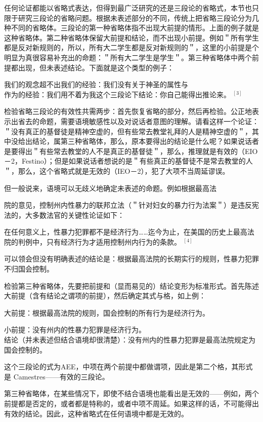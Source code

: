 任何论证都能以省略式表达，但得到最广泛研究的还是三段论的省略式，本节也只限于研究三段论的省略问题。根据未表述部分的不同，传统上把省略三段论分为几种不同的省略体。三段论的第一种省略体指不出现大前提的情形。上面的例子就是这种省略体。第二种省略体保留大前提和结论，而不出现小前提。例如＂所有学生都是反对新规则的，所以，所有大二学生都是反对新规则的＂，这里的小前提是个明显为真很容易补充出的命题：＂所有大二学生是学生＂。第三种省略体中两个前提都出现，但未表述结论。下面就是这个类型的例子：

我们的观念超不出我们的经验：我们没有关于神圣的属性与\\
作为的经验：我们用不着为我这个三段论下结论：你自己能得出推论来。 ${ }^{[3]}$

检验省略三段论的有效性共需两步：首先恢复省略的部分，然后再检验。公正地表示出省去的命题，需要语境敏感性以及对说话者意图的理解。请看这样一个论证：＂没有真正的基督徒是精神空虚的，但有些常去教堂礼拜的人是精神空虚的＂，其中没给出结论，属第三种省略体，那么，原本要得出的结论是什么呢？如果说话者是要得出＂有些常去教堂的人不是真正的基督徒＂，那么，推理就是有效的（EIO－2，Festino）；但是如果说话者想说的是＂有些真正的基督徒不是常去教堂的人＂，那么，这个省略式就是无效的（IEO－2），犯了大项不当周延谬误。

但一般说来，语境可以无歧义地确定未表述的命题。例如根据最高法

院的意见，控制州内性暴力的联邦立法（＂针对妇女的暴力行为法案＂）是违反宪法的，大多数法官的关键性论证如下：

在任何意义上，性暴力犯罪都不是经济行为……迄今为止，在美国的历史上最高法院的判例中，只有经济行为才适用控制州内行为的条款。 ${ }^{[4]}$

可以领会但没有明确表述的结论是：根据最高法院的长期实行的规则，性暴力犯罪不归国会控制。

检验第三种省略体，先要把前提和（显而易见的）结论变形为标准形式。首先陈述大前提（含有结论之谓项的前提），然后确定其式与格，如上例：

大前提：根据最高法院的规则，国会控制的所有行为是经济行为。

小前提：没有州内的性暴力犯罪是经济行为。\\
结论（并未表述但结合语境却很清楚）：没有州内的性暴力犯罪是最高法院规定为国会控制的。

这个三段论的式为AEE，中项在两个前提中都做谓项，因此是第二个格，其形式是 Camestres——有效的三段论。

第三种省略体，在某些情况下，即使不结合语境也能看出是无效的——例如，两个前提都是否定的，或者都是特称的，或者中项不周延。如果这样的话，不可能得出有效的结论。因此，这种省略式在任何语境中都是无效的。

